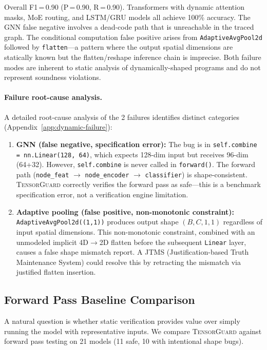 \documentclass[11pt]{article}
\begin{document}
Overall F1\,=\,0.90 (P\,=\,0.90, R\,=\,0.90).  Transformers with
dynamic attention masks, MoE routing, and LSTM/GRU models all achieve
100\% accuracy.  The GNN false negative involves a dead-code path
that is unreachable in the traced graph.  The conditional computation
false positive arises from \texttt{AdaptiveAvgPool2d} followed by
\texttt{flatten}---a pattern where the output spatial dimensions
are statically known but the flatten/reshape inference chain is
imprecise.  Both failure modes are inherent to static analysis of
dynamically-shaped programs and do not represent soundness violations.

\paragraph{Failure root-cause analysis.}
A detailed root-cause analysis of the 2 failures identifies distinct
categories (Appendix~\ref{app:dynamic-failure}):
\begin{enumerate}[leftmargin=2em]
  \item \textbf{GNN (false negative, specification error):}
    The bug is in \texttt{self.combine = nn.Linear(128, 64)}, which
    expects 128-dim input but receives 96-dim (64+32).  However,
    \texttt{self.combine} is never called in \texttt{forward()}.
    The forward path (\texttt{node\_feat} $\to$ \texttt{node\_encoder}
    $\to$ \texttt{classifier}) is shape-consistent.  \textsc{TensorGuard}
    correctly verifies the forward pass as safe---this is a benchmark
    specification error, not a verification engine limitation.
  \item \textbf{Adaptive pooling (false positive, non-monotonic constraint):}
    \texttt{AdaptiveAvgPool2d((1,1))} produces output shape
    $(B, C, 1, 1)$ regardless of input spatial dimensions.  This
    non-monotonic constraint, combined with an unmodeled implicit
    4D$\to$2D flatten before the subsequent \texttt{Linear} layer,
    causes a false shape mismatch report.  A JTMS (Justification-based
    Truth Maintenance System) could resolve this by retracting the
    mismatch via justified flatten insertion.
\end{enumerate}

\subsection{Forward Pass Baseline Comparison}\label{sec:forward-pass}

A natural question is whether static verification provides value over
simply running the model with representative inputs.  We compare
\textsc{TensorGuard} against forward pass testing on 21 models
(11 safe, 10 with intentional shape bugs).
\end{document}
